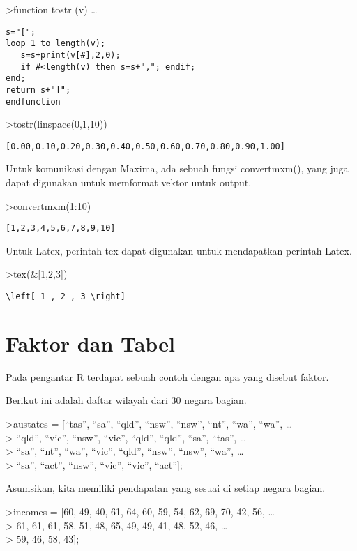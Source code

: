 \documentclass[
]{book}
\begin{document}
\textgreater function tostr (v) \ldots{}

\begin{verbatim}
s="[";
loop 1 to length(v);
   s=s+print(v[#],2,0);
   if #<length(v) then s=s+","; endif;
end;
return s+"]";
endfunction
\end{verbatim}

\textgreater tostr(linspace(0,1,10))

\begin{verbatim}
[0.00,0.10,0.20,0.30,0.40,0.50,0.60,0.70,0.80,0.90,1.00]
\end{verbatim}

Untuk komunikasi dengan Maxima, ada sebuah fungsi convertmxm(), yang juga dapat digunakan untuk memformat vektor untuk output.

\textgreater convertmxm(1:10)

\begin{verbatim}
[1,2,3,4,5,6,7,8,9,10]
\end{verbatim}

Untuk Latex, perintah tex dapat digunakan untuk mendapatkan perintah Latex.

\textgreater tex(\&{[}1,2,3{]})

\begin{verbatim}
\left[ 1 , 2 , 3 \right] 
\end{verbatim}

\chapter{Faktor dan Tabel}\label{faktor-dan-tabel}

Pada pengantar R terdapat sebuah contoh dengan apa yang disebut faktor.

Berikut ini adalah daftar wilayah dari 30 negara bagian.

\textgreater austates = {[}``tas'', ``sa'', ``qld'', ``nsw'', ``nsw'', ``nt'', ``wa'', ``wa'', \ldots{}\\
\textgreater{} ``qld'', ``vic'', ``nsw'', ``vic'', ``qld'', ``qld'', ``sa'', ``tas'', \ldots{}\\
\textgreater{} ``sa'', ``nt'', ``wa'', ``vic'', ``qld'', ``nsw'', ``nsw'', ``wa'', \ldots{}\\
\textgreater{} ``sa'', ``act'', ``nsw'', ``vic'', ``vic'', ``act''{]};

Asumsikan, kita memiliki pendapatan yang sesuai di setiap negara bagian.

\textgreater incomes = {[}60, 49, 40, 61, 64, 60, 59, 54, 62, 69, 70, 42, 56, \ldots{}\\
\textgreater{} 61, 61, 61, 58, 51, 48, 65, 49, 49, 41, 48, 52, 46, \ldots{}\\
\textgreater{} 59, 46, 58, 43{]};
\end{document}
